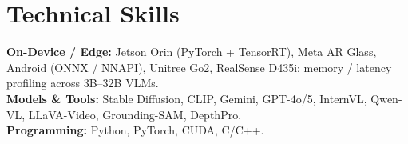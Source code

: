 \documentclass[11pt, letterpaper]{article}
\begin{document}
\section{Technical Skills}
\textbf{On-Device / Edge:} Jetson Orin (PyTorch + TensorRT), Meta AR Glass, Android (ONNX / NNAPI), Unitree Go2, RealSense D435i; memory / latency profiling across 3B--32B VLMs.\\[2pt]
\textbf{Models \& Tools:} Stable Diffusion, CLIP, Gemini, GPT-4o/5, InternVL, Qwen-VL, LLaVA-Video, Grounding-SAM, DepthPro.\\[2pt]
\textbf{Programming:} Python, PyTorch, CUDA, C/C++.
\end{document}
